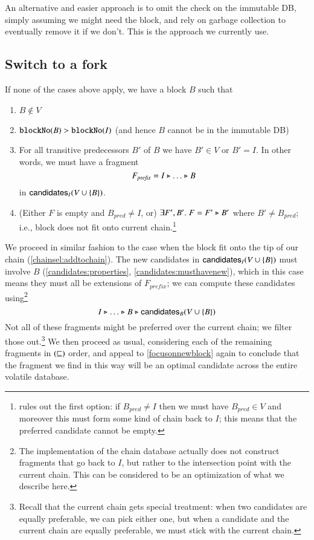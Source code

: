 An alternative and easier approach is to omit the check on the immutable DB,
simply assuming we might need the block, and rely on garbage collection to
eventually remove it if we don't. This is the approach we currently use.

\subsection{Switch to a fork}
\label{chainsel:switchtofork}

If none of the cases above apply, we have a block $B$ such that

\begin{enumerate}
\item \label{chainsel:switchtofork:notinvoldb}
$B \notin V$
\item \label{chainsel:switchtofork:notinimmdb}
$\mathtt{blockNo}(B) > \mathtt{blockNo}(I)$ (and hence $B$ cannot be in the immutable DB)
\item \label{chainsel:switchtofork:connected}
For all transitive predecessors $B'$ of $B$ we have $B' \in V$ or $B' = I$.
In other words, we must have a fragment
$$F_\mathit{prefix} = I \mathrel{\triangleright} \ldots \mathrel{\triangleright} B$$
in $\mathsf{candidates}_I(V \cup \{B\})$.
\item \label{chainsel:switchtofork:doesnotfit}
(Either $F$ is empty and $B_\mathit{pred} \neq I$, or) $\exists F', B' .\;
F = F' \mathrel{\triangleright} B'$ where $B' \neq B_\mathit{pred}$; i.e., block does not fit onto
current chain.\footnote{ rules out the
first option: if $B_\mathit{pred} \neq I$ then we must have $B_\mathit{pred} \in
V$ and moreover this must form some kind of chain back to $I$; this means that
the preferred candidate cannot be empty.}
\end{enumerate}

We proceed in similar fashion to the case when the block fit onto the tip of our
chain (\cref{chainsel:addtochain}). The new candidates in $\mathsf{candidates}_I(V \cup
\{B\})$ must involve $B$ (\cref{candidates:properties},
\cref{candidates:musthavenew}), which in this case means they must all be
extensions of $F_\mathit{prefix}$; we can compute these candidates
using\footnote{The implementation of the chain database actually does not
construct fragments that go back to $I$, but rather to the intersection point
with the current chain. This can be considered to be an optimization of what we
describe here.}
$$I \mathrel{\triangleright} \ldots \mathrel{\triangleright} B \mathrel{\triangleright} \mathsf{candidates}_B(V \cup \{B\})$$
Not all of these fragments might be preferred over the current chain; we filter
those out.\footnote{Recall that the current chain gets special treatment: when
two candidates are equally preferable, we can pick either one, but when a
candidate and the current chain are equally preferable, we must stick with the
current chain.} We then proceed as usual, considering each of the remaining
fragments in $(\mathrel{\sqsubseteq})$ order, and appeal to \cref{focusonnewblock}
again to conclude that the fragment we find in this way will be an optimal
candidate across the entire volatile database.


